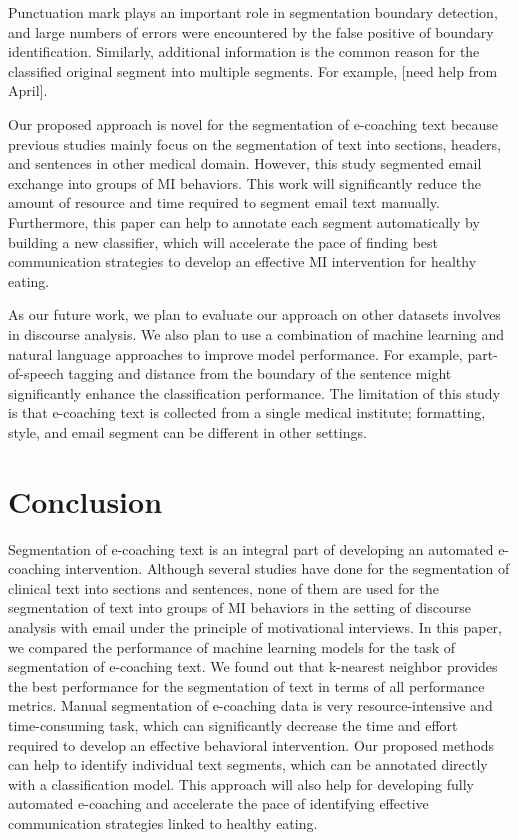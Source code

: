 \documentclass{amia}
\begin{document}
Punctuation mark plays an important role in segmentation boundary detection, and large numbers of errors were encountered by the false positive of boundary identification. Similarly, additional information is the common reason for the classified original segment into multiple segments. For example, [need help from April].

Our proposed approach is novel for the segmentation of e-coaching text because previous studies mainly focus on the segmentation of text into sections, headers, and sentences in other medical domain. However, this study segmented email exchange into groups of MI behaviors. This work will significantly reduce the amount of resource and time required to segment email text manually. Furthermore, this paper can help to annotate each segment automatically by building a new classifier, which will accelerate the pace of finding best communication strategies to develop an effective MI intervention for healthy eating.

As our future work, we plan to evaluate our approach on other datasets involves in discourse analysis. We also plan to use a combination of machine learning and natural language approaches to improve model performance. For example, part-of-speech tagging and distance from the boundary of the sentence might significantly enhance the classification performance. The limitation of this study is that e-coaching text is collected from a single medical institute; formatting, style, and email segment can be different in other settings.
 
\section*{Conclusion}
Segmentation of e-coaching text is an integral part of developing an automated e-coaching intervention. Although several studies have done for the segmentation of clinical text into sections and sentences, none of them are used for the segmentation of text into groups of MI behaviors in the setting of discourse analysis with email under the principle of motivational interviews. In this paper, we compared the performance of machine learning models for the task of segmentation of e-coaching text. We found out that k-nearest neighbor provides the best performance for the segmentation of text in terms of all performance metrics. Manual segmentation of e-coaching data is very resource-intensive and time-consuming task, which can significantly decrease the time and effort required to develop an effective behavioral intervention. Our proposed methods can help to identify individual text segments, which can be annotated directly with a classification model. This approach will also help for developing fully automated e-coaching and accelerate the pace of identifying effective communication strategies linked to healthy eating.
\end{document}
